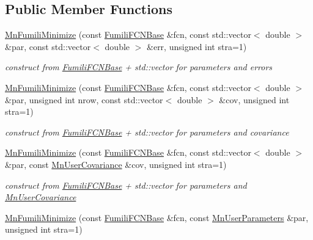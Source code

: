 \subsection*{Public Member Functions}
\begin{DoxyCompactItemize}
\item 
\mbox{\hyperlink{classROOT_1_1Minuit2_1_1MnFumiliMinimize_a2e8cffba3a44be7488ead2240a1d3149}{Mn\+Fumili\+Minimize}} (const \mbox{\hyperlink{classROOT_1_1Minuit2_1_1FumiliFCNBase}{Fumili\+F\+C\+N\+Base}} \&fcn, const std\+::vector$<$ double $>$ \&par, const std\+::vector$<$ double $>$ \&err, unsigned int stra=1)
\begin{DoxyCompactList}\small\item\em construct from \mbox{\hyperlink{classROOT_1_1Minuit2_1_1FumiliFCNBase}{Fumili\+F\+C\+N\+Base}} + std\+::vector for parameters and errors \end{DoxyCompactList}\item 
\mbox{\hyperlink{classROOT_1_1Minuit2_1_1MnFumiliMinimize_ad12e919e837251ef358a0d461355e51c}{Mn\+Fumili\+Minimize}} (const \mbox{\hyperlink{classROOT_1_1Minuit2_1_1FumiliFCNBase}{Fumili\+F\+C\+N\+Base}} \&fcn, const std\+::vector$<$ double $>$ \&par, unsigned int nrow, const std\+::vector$<$ double $>$ \&cov, unsigned int stra=1)
\begin{DoxyCompactList}\small\item\em construct from \mbox{\hyperlink{classROOT_1_1Minuit2_1_1FumiliFCNBase}{Fumili\+F\+C\+N\+Base}} + std\+::vector for parameters and covariance \end{DoxyCompactList}\item 
\mbox{\hyperlink{classROOT_1_1Minuit2_1_1MnFumiliMinimize_a48eae3f1c5b8eef3b6940d3fd5d26af8}{Mn\+Fumili\+Minimize}} (const \mbox{\hyperlink{classROOT_1_1Minuit2_1_1FumiliFCNBase}{Fumili\+F\+C\+N\+Base}} \&fcn, const std\+::vector$<$ double $>$ \&par, const \mbox{\hyperlink{classROOT_1_1Minuit2_1_1MnUserCovariance}{Mn\+User\+Covariance}} \&cov, unsigned int stra=1)
\begin{DoxyCompactList}\small\item\em construct from \mbox{\hyperlink{classROOT_1_1Minuit2_1_1FumiliFCNBase}{Fumili\+F\+C\+N\+Base}} + std\+::vector for parameters and \mbox{\hyperlink{classROOT_1_1Minuit2_1_1MnUserCovariance}{Mn\+User\+Covariance}} \end{DoxyCompactList}\item 
\mbox{\hyperlink{classROOT_1_1Minuit2_1_1MnFumiliMinimize_aec4f0adff373393b4023f3a783b7d4bd}{Mn\+Fumili\+Minimize}} (const \mbox{\hyperlink{classROOT_1_1Minuit2_1_1FumiliFCNBase}{Fumili\+F\+C\+N\+Base}} \&fcn, const \mbox{\hyperlink{classROOT_1_1Minuit2_1_1MnUserParameters}{Mn\+User\+Parameters}} \&par, unsigned int stra=1)

\end{DoxyCompactItemize}
